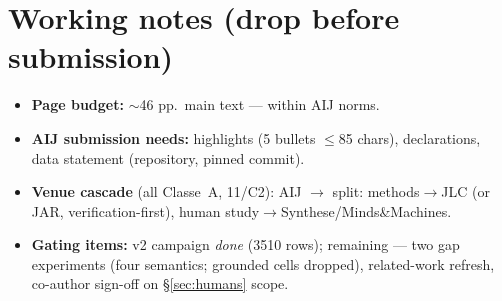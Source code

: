 \documentclass[preprint,12pt]{elsarticle}
\begin{document}
\section*{Working notes (drop before submission)}
\begin{itemize}[leftmargin=1.5em]
\item \textbf{Page budget:} $\sim$46 pp.\ main text --- within AIJ norms.
\item \textbf{AIJ submission needs:} highlights (5 bullets $\le$85 chars),
declarations, data statement (repository, pinned commit).
\item \textbf{Venue cascade} (all Classe~A, 11/C2): AIJ $\rightarrow$ split:
methods$\rightarrow$JLC (or JAR, verification-first), human
study$\rightarrow$Synthese/Minds\&Machines.
\item \textbf{Gating items:} v2 campaign \emph{done} (3510 rows); remaining ---
two gap experiments (four semantics; grounded cells dropped), related-work
refresh, co-author sign-off on \S\ref{sec:humans} scope.
\end{itemize}
\end{document}
